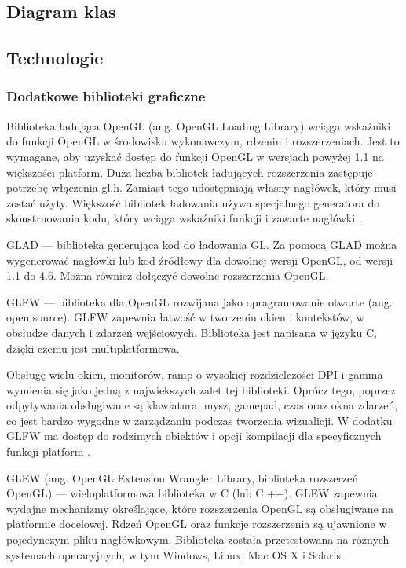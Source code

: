 \subsection{Diagram klas}

\newpage
\subsection{Technologie}
\subsubsection{Dodatkowe biblioteki graficzne}
Biblioteka ładująca OpenGL (ang. OpenGL Loading Library) wciąga wskaźniki do funkcji OpenGL w środowisku wykonawczym, rdzeniu i rozszerzeniach. Jest to wymagane, aby uzyskać dostęp do funkcji OpenGL w wersjach powyżej 1.1 na większości platform. Duża liczba bibliotek ładujących rozszerzenia zastępuje potrzebę włączenia gl.h. Zamiast tego udostępniają własny nagłówek, który musi zostać użyty. Większość bibliotek ładowania używa specjalnego generatora do skonstruowania kodu, który wciąga wskaźniki funkcji i zawarte nagłówki \cite{LoadingLibrary}. 

GLAD --- biblioteka generująca kod do ładowania GL. Za pomocą GLAD można wygenerować nagłówki lub kod źródłowy dla dowolnej wersji OpenGL, od wersji 1.1 do 4.6. Można również dołączyć dowolne rozszerzenia OpenGL.

GLFW --- biblioteka dla OpenGL rozwijana jako opragramowanie otwarte (ang. open source). GLFW zapewnia łatwość w tworzeniu okien i kontekstów, w obsłudze danych i zdarzeń wejściowych. Biblioteka jest napisana w języku C, dzięki czemu jest multiplatformowa.  

Obsługę wielu okien, monitorów, ramp o wysokiej rozdzielczości DPI i gamma wymienia się jako jedną z najwiekszych zalet tej biblioteki. Oprócz tego, poprzez odpytywania obsługiwane są klawiatura, mysz, gamepad, czas oraz okna zdarzeń, co jest bardzo wygodne w zarządzaniu podczas tworzenia wizualicji. W dodatku GLFW ma dostęp do rodzimych obiektów i opcji kompilacji dla specyficznych funkcji platform \cite{glfw}.

GLEW (ang. OpenGL Extension Wrangler Library, biblioteka rozszerzeń OpenGL) --- wieloplatformowa biblioteka w C (lub C ++). GLEW zapewnia wydajne mechanizmy określające, które rozszerzenia OpenGL są obsługiwane na platformie docelowej. Rdzeń OpenGL oraz funkcje rozszerzenia są ujawnione w pojedynczym pliku nagłówkowym. Biblioteka została przetestowana na różnych systemach operacyjnych, w tym Windows, Linux, Mac OS X i Solaris \cite{glew}.

